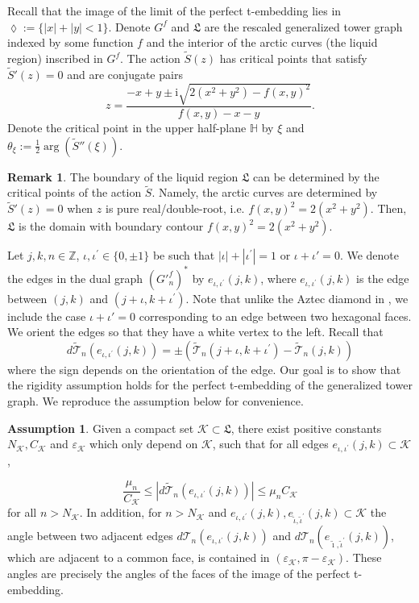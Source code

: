 \documentclass[12pt]{amsart}
\newcommand{\io}{{\iota}}
\newcommand{\tS}{{\widetilde S}}
\numberwithin{equation}{section}
\theoremstyle{definition}
\newtheorem{remark}[thm]{Remark}
\newtheorem{assumption}[thm]{Assumption}
\begin{document}
Recall that the image of the limit of the perfect t-embedding lies in $\lozenge:=\{|x|+|y|<1\}$. Denote $G^f$ and $\mathfrak{L}$ are the rescaled generalized tower graph indexed by some function $f$ and the interior of the arctic curves (the liquid region) inscribed in $G^f$. The action $\tS(z)$ has critical points that satisfy $\tS'(z)=0$ and are conjugate pairs
\[
z = \frac{-x+y\pm \mathrm i\sqrt{2(x^2+y^2)-f(x,y)^2}}{f(x,y)-x-y}.
\]
Denote the critical point in the upper half-plane $\mathbb H$ by $\displaystyle  \xi$ and $\theta_\xi:=\frac{1}{2}\operatorname{arg}(\tS''(\xi))$. 
\begin{remark}
    \label{remark: arctic_from_crit_point}
    The boundary of the liquid region $\mathfrak L$ can be determined by the critical points of the action $\tS$. Namely, the arctic curves are determined by $\tS'(z)=0$ when $z$ is pure real/double-root, i.e. $f(x,y)^2=2(x^2+y^2)$. Then, $\mathfrak L$ is the domain with boundary contour $f(x,y)^2=2(x^2+y^2)$.
\end{remark}
Let $j, k, n\in \mathbb{Z}$, $\iota, \iota^{\prime}\in \{0, \pm 1\}$ be such that $|\iota|+\left|\iota^{\prime}\right|=1$ or $\io+\io'=0$. We denote the edges in the dual graph $\left(G'^f_n\right)^*$ by $e_{\iota, \iota^{\prime}}(j, k)$, where $e_{\iota, \iota^{\prime}}(j, k)$ is the edge between $(j, k)$ and $\left(j+\iota, k+\iota^{\prime}\right)$. {Note that unlike the Aztec diamond in \cite{tower_AD_perfect}, we include the case $\io+\io'=0$ corresponding to an edge between two hexagonal faces.} We orient the edges so that they have a white vertex to the left. Recall that
$$
d \widetilde{\mathcal{T}}_n\left(e_{\iota, \iota^{\prime}}(j, k)\right)= \pm\left(\widetilde{\mathcal{T}}_n\left(j+\iota, k+\iota^{\prime}\right)-\widetilde{\mathcal{T}}_n(j, k)\right)
$$
where the sign depends on the orientation of the edge. Our goal is to show that the rigidity assumption holds for the perfect t-embedding of the generalized tower graph. We reproduce the assumption below for convenience.

\begin{assumption}
    Given a compact set $\mathcal{K} \subset \mathfrak{L}$, there exist positive constants $N_{\mathcal{K}}, C_{\mathcal{K}}$ and $\varepsilon_{\mathcal{K}}$ which only depend on $\mathcal{K}$, such that for all edges $e_{\iota, \iota^{\prime}}(j, k) \subset \mathcal{K}$,

$$
\frac{\mu_n}{C_{\mathcal{K}}} \leq\left|d \widetilde{\mathcal{T}}_n\left(e_{\iota, \iota^{\prime}}(j, k)\right)\right| \leq \mu_n C_{\mathcal{K}}
$$
for all $n>N_{\mathcal{K}}$. In addition, for $n>N_{\mathcal{K}}$ and $e_{\iota, \iota^{\prime}}(j, k), e_{\tilde{\iota}, \tilde{\iota}^{\prime}}(j, k) \subset \mathcal{K}$ the angle between two adjacent edges $d \mathcal{T}_n\left(e_{\iota, \iota^{\prime}}(j, k)\right)$ and $d \mathcal{T}_n\left(e_{\tilde{\imath},\tilde \iota^{\prime}}(j, k)\right)$, which are adjacent to a common face, is contained in $\left(\varepsilon_{\mathcal{K}}, \pi-\varepsilon_{\mathcal{K}}\right)$. These angles are precisely the angles of the faces of the image of the perfect t-embedding.
\end{assumption}
\end{document}
